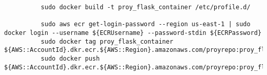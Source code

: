 \begin{verbatim}
          sudo docker build -t proy_flask_container /etc/profile.d/

          sudo aws ecr get-login-password --region us-east-1 | sudo docker login --username ${ECRUsername} --password-stdin ${ECRPassword}
          sudo docker tag proy_flask_container ${AWS::AccountId}.dkr.ecr.${AWS::Region}.amazonaws.com/proyrepo:proy_flask_container
          sudo docker push ${AWS::AccountId}.dkr.ecr.${AWS::Region}.amazonaws.com/proyrepo:proy_flask_container
\end{verbatim}
